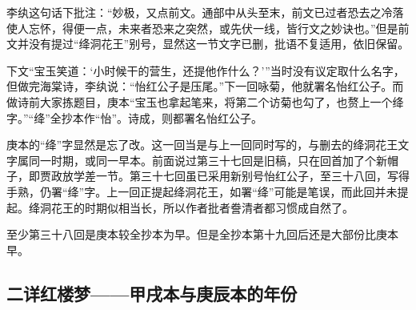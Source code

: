 \par 李纨这句话下批注：“妙极，又点前文。通部中从头至末，前文已过者恐去之冷落使人忘怀，得便一点，未来者恐来之突然，或先伏一线，皆行文之妙诀也。”但是前文并没有提过“绛洞花王”别号，显然这一节文字已删，批语不复适用，依旧保留。
\par 下文“宝玉笑道：‘小时候干的营生，还提他作什么？'”当时没有议定取什么名字，但做完海棠诗，李纨说：“怡红公子是压尾。”下一回咏菊，他就署名怡红公子。而做诗前大家拣题目，庚本“宝玉也拿起笔来，将第二个访菊也勾了，也赘上一个绛字。”“绛”全抄本作“怡”。诗成，则都署名怡红公子。
\par 庚本的“绛”字显然是忘了改。这一回当是与上一回同时写的，与删去的绛洞花王文字属同一时期，或同一早本。前面说过第三十七回是旧稿，只在回首加了个新帽子，即贾政放学差一节。第三十七回虽已采用新别号怡红公子，至三十八回，写得手熟，仍署“绛”字。上一回正提起绛洞花王，如署“绛”可能是笔误，而此回并未提起。绛洞花王的时期似相当长，所以作者批者誊清者都习惯成自然了。
\par 至少第三十八回是庚本较全抄本为早。但是全抄本第十九回后还是大部份比庚本早。




\subsection{二详红楼梦——甲戌本与庚辰本的年份}


